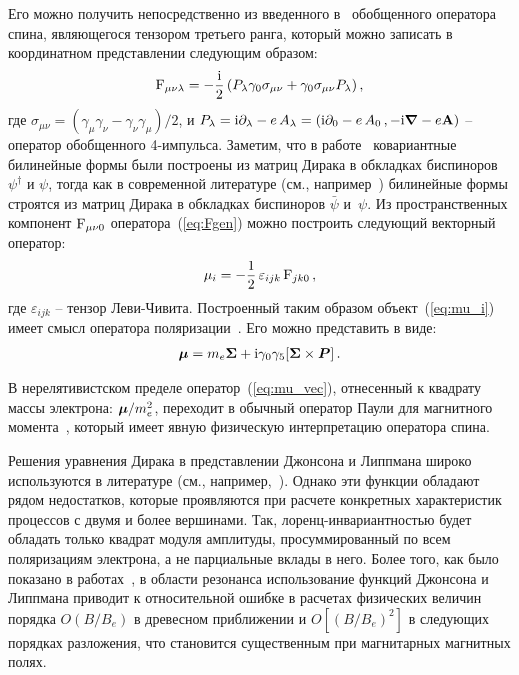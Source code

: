 Его можно получить непосредственно 
из введенного в~\cite{Sokolov:1968} обобщенного оператора спина, 
являющегося тензором третьего ранга, который можно записать в координатном представлении следующим образом:
%
\begin{eqnarray}
	{\rm F}_{\mu \nu \lambda} = - \frac{\mathrm{i}}{2} \left( P_\lambda \gamma_0 \sigma_{\mu \nu} 
	+ \gamma_0 \sigma_{\mu \nu} P_\lambda \right),
	\label{eq:Fgen}
\end{eqnarray}
%
\noindent где $\sigma_{\mu \nu} = (\gamma_\mu \gamma_\nu - \gamma_\nu \gamma_\mu)/2$, и  
$P_\lambda = \mathrm{i} \partial_\lambda -e \, A_\lambda = \left( \mathrm{i} \partial_0 -e \, A_0 \,, 
- \mathrm{i} {\boldsymbol \nabla} -e {\bf A} \right)$ -- оператор обобщенного 4-импульса. 
Заметим, что в работе~\cite{Sokolov:1968} ковариантные билинейные формы были построены из матриц Дирака в обкладках  биспиноров 
$\psi^{\dagger}$ и $\psi$, тогда как в современной литературе (см., например~\cite{Peskin:1995}) билинейные формы строятся из матриц 
Дирака в обкладках биспиноров $\bar\psi$ и~$\psi$. Из пространственных компонент ${\rm F}_{\mu \nu 0}$ 
оператора~(\ref{eq:Fgen}) можно построить следующий векторный оператор:
%
\begin{eqnarray}
	\mu_i = - \frac{1}{2} \, \varepsilon_{ijk} \, {\rm F}_{jk0} \,, 
	\label{eq:mu_i}
\end{eqnarray}
%
где $\varepsilon_{ijk}$ -- тензор Леви-Чивита.  
Построенный таким образом объект~(\ref{eq:mu_i})  имеет смысл 
оператора поляризации~\cite{Sokolov:1968,Melrose:1983}.
Его можно представить в виде:
%
\begin{eqnarray}
	{\boldsymbol\mu} = m_e {\boldsymbol \Sigma} + \mathrm{i} \gamma_0 \gamma_5 [{\boldsymbol \Sigma} \times {\boldsymbol P}] \, .
	\label{eq:mu_vec}
\end{eqnarray}

В нерелятивистском пределе оператор~(\ref{eq:mu_vec}), 
отнесенный к квадрату массы электрона:  ${\boldsymbol \mu}/m_e^2$,  
переходит в обычный оператор Паули для магнитного момента~\cite{Landau:1989}, 
который имеет явную физическую интерпретацию оператора спина.

Решения уравнения Дирака в представлении Джонсона и Липпмана широко используются в литературе (см., например,~\cite{Canuto:1975,Harding:1991,Suh:1999,Gonthier:2000,Jones:2010,Melrose:2020}). Однако эти функции обладают рядом недостатков, которые проявляются при расчете конкретных характеристик процессов с двумя и более вершинами. Так, лоренц-инвариантностью будет обладать только квадрат модуля амплитуды, просуммированный по всем поляризациям электрона, а не парциальные вклады в него. Более того, как было показано в работах~\cite{Graziani:1993,Gonthier:2014}, в области резонанса использование функций Джонсона и Липпмана приводит к относительной ошибке в расчетах физических величин порядка $O(B / B_{e})$ в древесном приближении и $O[(B / B_{e})^2]$ в следующих порядках разложения, что становится существенным при магнитарных магнитных полях.

